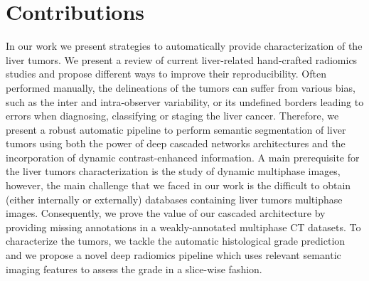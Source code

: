 \section{Contributions}
In our work we present strategies to automatically provide characterization of the liver tumors.
We present a review of current liver-related hand-crafted radiomics studies and propose different ways to improve their reproducibility.
Often performed manually, the delineations of the tumors can suffer from various bias, such as the inter and intra-observer variability, or its undefined borders leading to errors when diagnosing, classifying or staging the liver cancer. Therefore, we present a robust automatic pipeline to perform semantic segmentation of liver tumors using both the power of deep cascaded networks architectures and the incorporation of dynamic contrast-enhanced information. A main prerequisite for the liver tumors characterization is the study of dynamic multiphase images, however, the main challenge that we faced in our work is the difficult to obtain (either internally or externally) databases containing liver tumors multiphase images. Consequently, we prove the value of our cascaded architecture by providing missing annotations in a weakly-annotated multiphase CT datasets.
To characterize the tumors, we tackle the automatic histological grade prediction and we propose a novel deep radiomics pipeline which uses relevant semantic imaging features to assess the grade in a slice-wise fashion.

